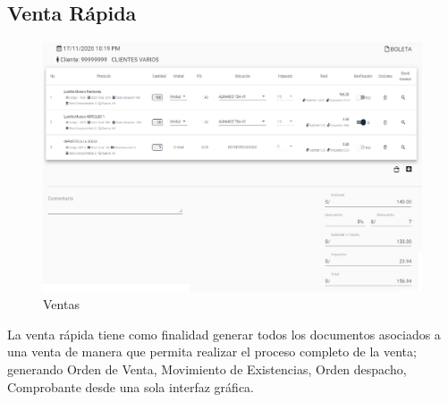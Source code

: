 \documentclass[pdftex,12pt,oneside,a4paper,spanish, english, brazil]{abntex2}
\begin{document}
\begin{sloppypar}
              \subsection{Venta Rápida}
              \begin{figure}[h!]
              	\centering
              	\caption{Ventas} \label{fig:maia}
              	\includegraphics[width=0.65\linewidth,frame=0.5pt 5pt]{img/VENTA}
              \end{figure}
              La venta rápida tiene como finalidad generar todos los documentos asociados a una venta de manera que permita realizar el proceso completo de la venta; generando Orden de Venta, Movimiento de Existencias, Orden despacho, Comprobante desde una sola interfaz gráfica.\\
              

\end{sloppypar}
\end{document}
